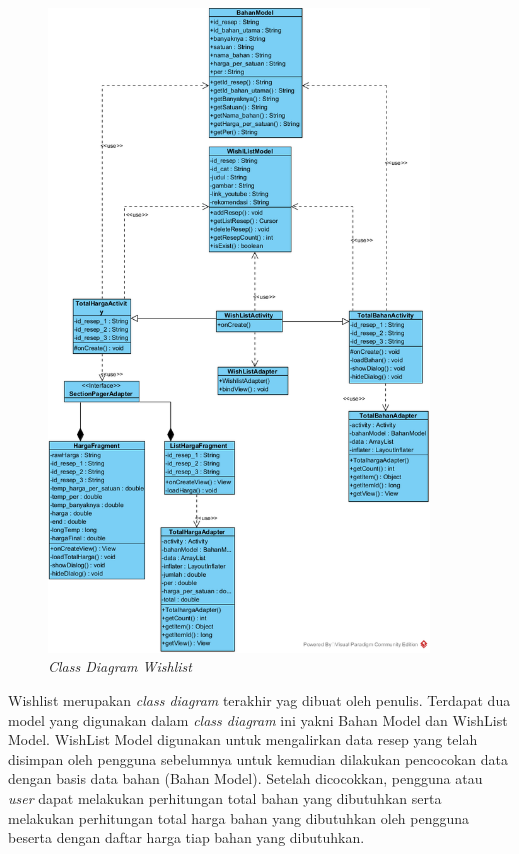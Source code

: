 		\begin{figure}[H]
			\centering
			\includegraphics[origin=c,width=0.9\textwidth]{gambar/class/Wishlist}
			\caption{\emph{Class Diagram Wishlist}}
		\end{figure}
		Wishlist merupakan \textit{class diagram} terakhir yag dibuat oleh penulis. Terdapat dua model yang digunakan dalam \textit{class diagram} ini yakni Bahan Model dan WishList Model. WishList Model digunakan untuk mengalirkan data resep yang telah disimpan oleh pengguna sebelumnya untuk kemudian dilakukan pencocokan data dengan basis data bahan (Bahan Model). Setelah dicocokkan, pengguna atau \textit{user} dapat melakukan perhitungan total bahan yang dibutuhkan serta melakukan perhitungan total harga bahan yang dibutuhkan oleh pengguna beserta dengan daftar harga tiap bahan yang dibutuhkan. 
		
